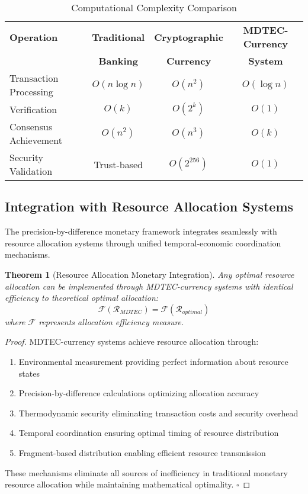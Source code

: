 \documentclass[12pt,a4paper]{article}
\newtheorem{theorem}{Theorem}
\begin{document}
\begin{table}[H]
\centering
\caption{Computational Complexity Comparison}
\begin{tabular}{@{}lccc@{}}
\toprule
\textbf{Operation} & \textbf{Traditional} & \textbf{Cryptographic} & \textbf{MDTEC-Currency} \\
& \textbf{Banking} & \textbf{Currency} & \textbf{System} \\
\midrule
Transaction Processing & $O(n \log n)$ & $O(n^2)$ & $O(\log n)$ \\
Verification & $O(k)$ & $O(2^k)$ & $O(1)$ \\
Consensus Achievement & $O(n^2)$ & $O(n^3)$ & $O(k)$ \\
Security Validation & Trust-based & $O(2^{256})$ & $O(1)$ \\
\bottomrule
\end{tabular}
\end{table}

\subsection{Integration with Resource Allocation Systems}

The precision-by-difference monetary framework integrates seamlessly with resource allocation systems through unified temporal-economic coordination mechanisms.

\begin{theorem}[Resource Allocation Monetary Integration]
Any optimal resource allocation can be implemented through MDTEC-currency systems with identical efficiency to theoretical optimal allocation:
\begin{equation}
\mathcal{F}(\mathcal{R}_{MDTEC}) = \mathcal{F}(\mathcal{R}_{optimal})
\end{equation}
where $\mathcal{F}$ represents allocation efficiency measure.
\end{theorem}

\begin{proof}
MDTEC-currency systems achieve resource allocation through:
\begin{enumerate}
\item Environmental measurement providing perfect information about resource states
\item Precision-by-difference calculations optimizing allocation accuracy
\item Thermodynamic security eliminating transaction costs and security overhead
\item Temporal coordination ensuring optimal timing of resource distribution
\item Fragment-based distribution enabling efficient resource transmission
\end{enumerate}

These mechanisms eliminate all sources of inefficiency in traditional monetary resource allocation while maintaining mathematical optimality. $\square$
\end{proof}
\end{document}
